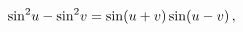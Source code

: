 \[{\mathop{\sin\/}\nolimits^{2}}u-{\mathop{\sin\/}\nolimits^{2}}v=\mathop{\sin\/%
}\nolimits\!\left(u+v\right)\mathop{\sin\/}\nolimits\!\left(u-v\right),\]